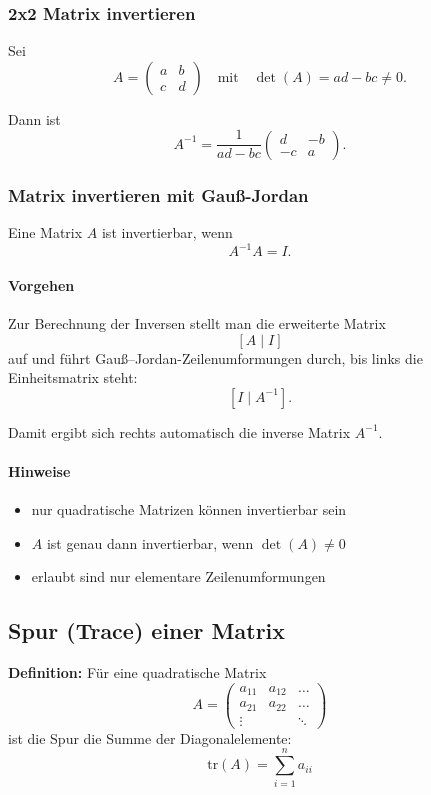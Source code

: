 \documentclass[10pt,a4paper,twocolumn]{article}
\begin{document}
	\subsubsection{2x2 Matrix invertieren}
	Sei
	\[
	A =
	\begin{pmatrix}
		a & b\\
		c & d
	\end{pmatrix}
	\quad\text{mit}\quad
	\det(A)=ad-bc \neq 0.
	\]
	
	Dann ist
	\[
	A^{-1}
	=
	\frac{1}{ad-bc}
	\begin{pmatrix}
		d & -b\\
		-c & a
	\end{pmatrix}.
	\]
	
	\subsubsection{Matrix invertieren mit Gauß-Jordan}
	
	Eine Matrix $A$ ist invertierbar, wenn
	\[
	A^{-1}A = I.
	\]
	
	\paragraph*{Vorgehen}
	Zur Berechnung der Inversen stellt man die erweiterte Matrix
	\[
	[A \mid I]
	\]
	auf und führt Gauß--Jordan-Zeilenumformungen durch, bis links die
	Einheitsmatrix steht:
	\[
	[I \mid A^{-1}].
	\]
	
	Damit ergibt sich rechts automatisch die inverse Matrix $A^{-1}$.
	
	\paragraph*{Hinweise}
	\begin{itemize}
		\item nur quadratische Matrizen können invertierbar sein
		\item $A$ ist genau dann invertierbar, wenn $\det(A)\neq 0$
		\item erlaubt sind nur elementare Zeilenumformungen
	\end{itemize}
	
	\subsection{Spur (Trace) einer Matrix}
	
	\textbf{Definition:} Für eine quadratische Matrix
	\[
	A=\begin{pmatrix}
		a_{11} & a_{12} & \dots \\
		a_{21} & a_{22} & \dots \\
		\vdots & & \ddots
	\end{pmatrix}
	\]
	ist die Spur die Summe der Diagonalelemente:
	\[
	\mathrm{tr}(A)=\sum_{i=1}^{n} a_{ii}
	\]
	
\end{document}
